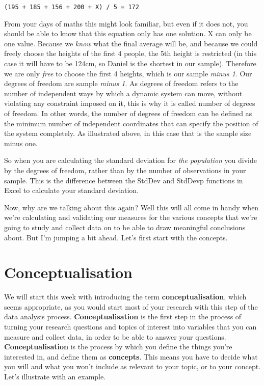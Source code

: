 \documentclass[
]{book}
\begin{document}
\texttt{(195\ +\ 185\ +\ 156\ +\ 200\ +\ X)\ /\ 5\ =\ 172}

From your days of maths this might look familiar, but even if it does not, you should be able to know that this equation only has one solution. X can only be one value. Because we \emph{know} what the final average will be, and because we could freely choose the heights of the first 4 people, the 5th height is restricted (in this case it will have to be 124cm, so Daniel is the shortest in our sample). Therefore we are only \emph{free} to choose the first 4 heights, which is our sample \emph{minus 1}. Our degrees of freedom are sample \emph{minus 1}. As degrees of freedom refers to the number of independent ways by which a dynamic system can move, without violating any constraint imposed on it, this is why it is called number of degrees of freedom. In other words, the number of degrees of freedom can be defined as the minimum number of independent coordinates that can specify the position of the system completely. As illustrated above, in this case that is the sample size minus one.

So when you are calculating the standard deviation for \emph{the population} you divide by the degrees of freedom, rather than by the number of observations in your sample. This is the difference between the StdDev and StdDevp functions in Excel to calculate your standard deviation.

Now, why are we talking about this again? Well this will all come in handy when we're calculating and validating our measures for the various concepts that we're going to study and collect data on to be able to draw meaningful conclusions about. But I'm jumping a bit ahead. Let's first start with the concepts.

\hypertarget{conceptualisation}{%
\section{Conceptualisation}\label{conceptualisation}}

We will start this week with introducing the term \textbf{conceptualisation}, which seems appropriate, as you would start most of your research with this step of the data analysis process. \textbf{Conceptualisation} is the first step in the process of turning your research questions and topics of interest into variables that you can measure and collect data, in order to be able to answer your questions. \textbf{Conceptualisation} is the process by which you define the things you're interested in, and define them as \textbf{concepts}. This means you have to decide what you will and what you won't include as relevant to your topic, or to your concept. Let's illustrate with an example.
\end{document}
